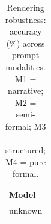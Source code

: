 \begin{table}[t]
  \centering
  \caption{Rendering robustness: accuracy (\%) across prompt modalities.
           M1 = narrative; M2 = semi-formal; M3 = structured; M4 = pure formal.}
  \label{tab:rendering_robustness}
  \begin{tabular}{l}
    \toprule
    Model &  \\
    \midrule
    unknown &  \\
    \bottomrule
  \end{tabular}
\end{table}
